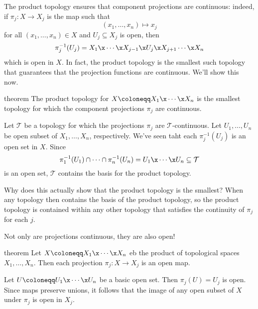 \documentclass[class=article, crop=false]{standalone}
\begin{document}
The product topology ensures that component projections are continuous: indeed, if $\pi_j : X \to X_j$ is the map such that
  \[
    (x_1, \ldots, x_n) \mapsto x_j
  \]
for all $(x_1, \ldots, x_n) \in X$ and $U_j \subseteq X_j$ is open, then
  \[
    \pi_j^{-1}(U_j) = X_1 \x \cdots \x X_{j-1} \x U_j \x X_{j+1} \cdots \x X_n
  \]
which is open in $X$. In fact, the product topology is the smallest such topology that guarantees that the projection functions are continuous. We'll show this now.

\begin{result}{theorem}
  The product topology for $X \coloneqq X_1 \x \cdots \x X_n$ is the smallest topology for which the component projections $\pi_j$ are continuous.
\end{result}
\begin{pf}
  Let $\mathcal T$ be a topology for which the projections $\pi_j$ are $\mathcal T$-continuous. Let $U_1, \ldots, U_n$ be open subset of $X_1, \ldots, X_n$, respectively. We've seen taht each $\pi_j^{-1}(U_j)$ is an open set in $X$. Since
    \[
      \pi_1^{-1}(U_1) \cap \cdots \cap \pi_n^{-1}(U_n) = U_1 \x \cdots \x U_n \subseteq \mathcal T
    \]
  is an open set, $\mathcal T$ contains the basis for the product topology.
\end{pf}
\begin{rem}
  Why does this actually show that the product topology is the smallest? When any topology then contains the basis of the product topology, so the product topology is contained within any other topology that satisfies the continuity of $\pi_j$ for each $j$.
\end{rem}

Not only are projections continuous, they are also open!

\begin{result}{theorem}
  Let $X \coloneqq X_1 \x \cdots \x X_n$ eb the product of topological spaces $X_1, \ldots, X_n$. Then each projection $\pi_j \colon X \to X_j$ is an open map.
\end{result}
\begin{pf}
  Let $U \coloneqq U_1 \x \cdots \x U_n$ be a basic open set. Then $\pi_j(U) = U_j$ is open. Since maps preserve unions, it follows that the image of any open subset of $X$ under $\pi_j$ is open in $X_j$.
\end{pf}
\end{document}
